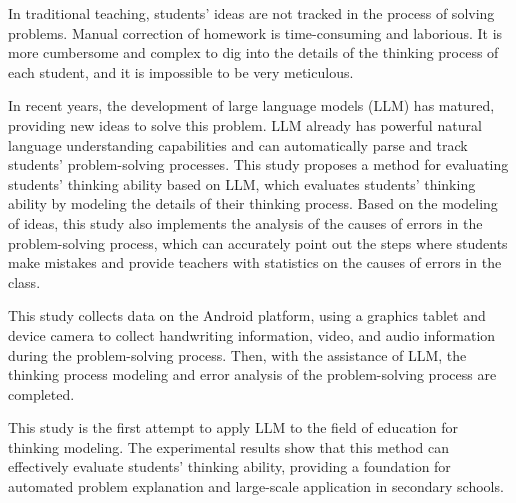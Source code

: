 \begin{abstract*}

  In traditional teaching, students' ideas are not tracked in the process of solving problems. Manual correction of homework is time-consuming and laborious. It is more cumbersome and complex to dig into the details of the thinking process of each student, and it is impossible to be very meticulous.

  In recent years, the development of large language models (LLM) has matured, providing new ideas to solve this problem. LLM already has powerful natural language understanding capabilities and can automatically parse and track students' problem-solving processes. This study proposes a method for evaluating students' thinking ability based on LLM, which evaluates students' thinking ability by modeling the details of their thinking process. Based on the modeling of ideas, this study also implements the analysis of the causes of errors in the problem-solving process, which can accurately point out the steps where students make mistakes and provide teachers with statistics on the causes of errors in the class.

  This study collects data on the Android platform, using a graphics tablet and device camera to collect handwriting information, video, and audio information during the problem-solving process. Then, with the assistance of LLM, the thinking process modeling and error analysis of the problem-solving process are completed.

  This study is the first attempt to apply LLM to the field of education for thinking modeling. The experimental results show that this method can effectively evaluate students' thinking ability, providing a foundation for automated problem explanation and large-scale application in secondary schools.

\end{abstract*}

